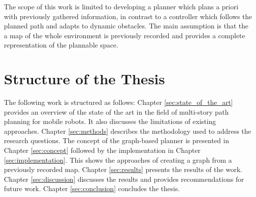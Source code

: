 The scope of this work is limited to developing a planner which plans a priori with previously gathered information, in contrast to a controller which follows the planned path and adapts to dynamic obstacles. The main assumption is that the a map of the whole environment is previously recorded and provides a complete representation of the plannable space.

\section{Structure of the Thesis}
\label{sec:structure}
The following work is structured as follows: Chapter \ref{sec:state_of_the_art} provides an overview of the state of the art in the field of multi-story path planning for mobile robots. It also discusses the limitations of existing approaches. Chapter \ref{sec:methods} describes the methodology used to address the research questions. The concept of the graph-based planner is presented in Chapter \ref{sec:concept} followed by the implementation in Chapter \ref{sec:implementation}. This shows the approaches of creating a graph from a previously recorded map. Chapter \ref{sec:results} presents the results of the work. Chapter \ref{sec:discussion} discusses the results and provides recommendations for future work. Chapter \ref{sec:conclusion} concludes the thesis.